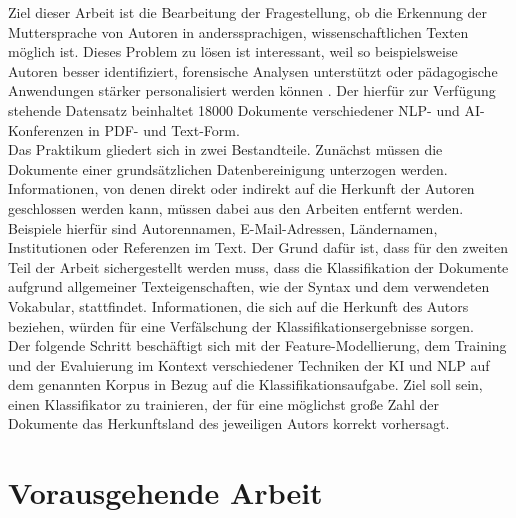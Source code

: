 \documentclass[bachelor,german]{info1thesis}
\begin{document}
Ziel dieser Arbeit ist die Bearbeitung der Fragestellung, ob die Erkennung der Muttersprache von Autoren in anderssprachigen, wissenschaftlichen Texten möglich ist. Dieses Problem zu lösen ist interessant, weil so beispielsweise Autoren besser identifiziert, forensische Analysen unterstützt oder pädagogische Anwendungen stärker personalisiert werden können \cite{Estival2007,Gibbons2003,Rozovskaya2011}.
Der hierfür zur Verfügung stehende Datensatz beinhaltet 18000 Dokumente verschiedener NLP- und AI-Konferenzen in PDF- und Text-Form. \\
Das Praktikum gliedert sich in zwei Bestandteile. Zunächst müssen die Dokumente einer grundsätzlichen Datenbereinigung unterzogen werden. Informationen, von denen direkt oder indirekt auf die Herkunft der Autoren geschlossen werden kann, müssen dabei aus den Arbeiten entfernt werden. Beispiele hierfür sind Autorennamen, E-Mail-Adressen, Ländernamen, Institutionen oder Referenzen im Text. Der Grund dafür ist, dass für den zweiten Teil der Arbeit sichergestellt werden muss, dass die Klassifikation der Dokumente aufgrund allgemeiner Texteigenschaften, wie der Syntax und dem verwendeten Vokabular, stattfindet.
Informationen, die sich auf die Herkunft des Autors beziehen, würden für eine Verfälschung der Klassifikationsergebnisse sorgen. \\
Der folgende Schritt beschäftigt sich mit der Feature-Modellierung, dem Training und der Evaluierung im Kontext verschiedener Techniken der KI und NLP auf dem genannten Korpus in Bezug auf die Klassifikationsaufgabe. Ziel soll sein, einen Klassifikator zu trainieren, der für eine möglichst große Zahl der Dokumente das Herkunftsland des jeweiligen Autors korrekt vorhersagt. 

\chapter{Vorausgehende Arbeit}
\end{document}
